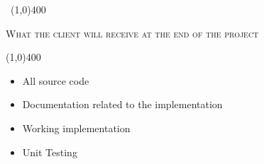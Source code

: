 \documentclass[12pt,a4paper]{report}
\begin{document}
\begin{center}
	
	\vspace*{-3cm}\
	\line(1,0){400}\\
	{\scshape\large What the client will receive at the end of the project\par}
	\line(1,0){400}\\
	\end{center}
		\begin{itemize}
\item All source code
\item Documentation related to the implementation
\item Working implementation
\item Unit Testing
\end{itemize}
\end{document}
